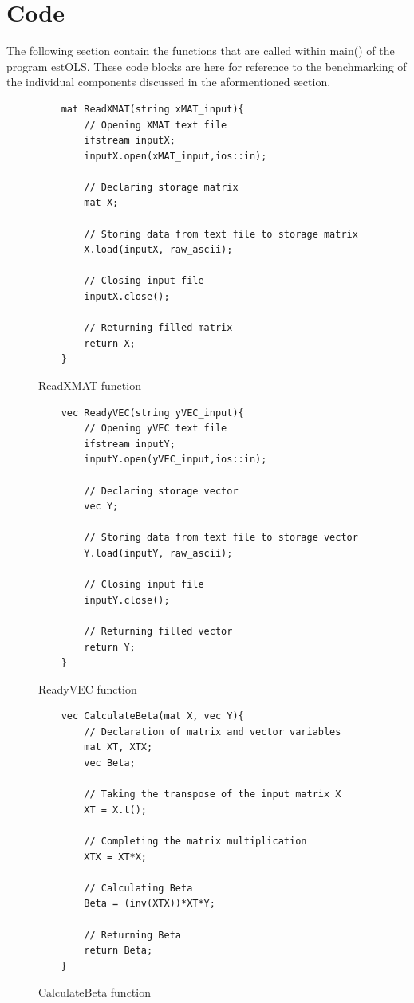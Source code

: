\documentclass{article}
\begin{document}
\section{Code}
The following section contain the functions that are called within main() of the program estOLS. These code blocks are here for reference to the benchmarking of the individual components discussed in the aformentioned section.

\begin{figure}[H]
\begin{lstlisting}
	mat ReadXMAT(string xMAT_input){
		// Opening XMAT text file
		ifstream inputX;
		inputX.open(xMAT_input,ios::in);
		
		// Declaring storage matrix
		mat X;
		
		// Storing data from text file to storage matrix
		X.load(inputX, raw_ascii);
		
		// Closing input file
		inputX.close();
		
		// Returning filled matrix
		return X;
	}
\end{lstlisting}
\caption{ReadXMAT function}\label{fig:ReadXMAT}
\end{figure}

\begin{figure}[H]
\begin{lstlisting}
	vec ReadyVEC(string yVEC_input){
		// Opening yVEC text file
		ifstream inputY;
		inputY.open(yVEC_input,ios::in);
		
		// Declaring storage vector
		vec Y;
		
		// Storing data from text file to storage vector
		Y.load(inputY, raw_ascii);
		
		// Closing input file
		inputY.close();
		
		// Returning filled vector
		return Y;
	}
\end{lstlisting}
\caption{ReadyVEC function}\label{fig:ReadyVEC}
\end{figure}

\begin{figure}[H]
\begin{lstlisting}
	vec CalculateBeta(mat X, vec Y){
		// Declaration of matrix and vector variables
		mat XT, XTX;
		vec Beta;
		
		// Taking the transpose of the input matrix X
		XT = X.t();
		
		// Completing the matrix multiplication
		XTX = XT*X;
		
		// Calculating Beta
		Beta = (inv(XTX))*XT*Y;
		
		// Returning Beta
		return Beta;
	}
\end{lstlisting}
\caption{CalculateBeta function}\label{fig:CalculateBeta}
\end{figure}
\end{document}
